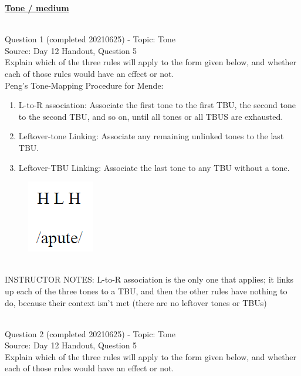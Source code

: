 \documentclass[12pt]{article}
\begin{document}
\newpage\textbf{\underline{\huge Tone / medium\\}}

~\\

{\large Question 1} (completed 20210625) - Topic: Tone\\
Source: Day 12 Handout, Question 5\\

Explain which of the three rules will apply to the form given below, and whether each of those rules would have an effect or not.\\

Peng’s Tone-Mapping Procedure for Mende: \begin{enumerate} \item L-to-R association: Associate the first tone to the first TBU, the second tone to the second TBU, and so on, until all tones or all TBUS are exhausted. \item Leftover-tone Linking: Associate any remaining unlinked tones to the last TBU. \item Leftover-TBU Linking: Associate the last tone to any TBU without a tone. \end{enumerate}

\begin{figure}[H]
\includegraphics{../images/mendetone_a.png}
\end{figure}

~\\
INSTRUCTOR NOTES: L-to-R association is the only one that applies; it links up each of the three tones to a TBU, and then the other rules have nothing to do, because their context isn't met (there are no leftover tones or TBUs)


~\\

{\large Question 2} (completed 20210625) - Topic: Tone\\
Source: Day 12 Handout, Question 5\\

Explain which of the three rules will apply to the form given below, and whether each of those rules would have an effect or not.\\
\end{document}
